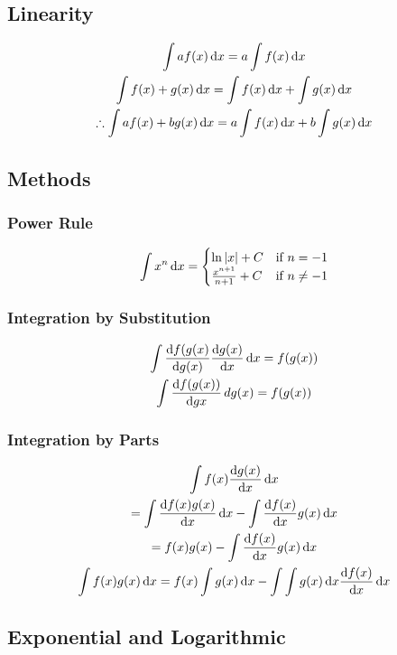 \documentclass[12pt]{article}
\begin{document}
		\subsection{Linearity}
			\begin{gather}
				\integral{af(x)} = a\integral{f(x)} \\
				\integral{f(x) + g(x)} = \integral{f(x)} +
				\integral{g(x)} \\
				\therefore \integral{af(x) + bg(x)} = a\integral{f(x)}
				+ b\integral{g(x)}
			\end{gather}
		\subsection{Methods}
			\subsubsection{Power Rule}
				\begin{gather}
					\integral{x^n} =
						\begin{cases}
							\ln |x| + C & \text{if }
							n = -1 \\
							\frac{x^{n+1}}{n+1} + C
							& \text{if } n \neq -1
						\end{cases}
				\end{gather}
			\subsubsection{Integration by Substitution}
				\begin{gather}
					\integral{\derivative[g(x)]{f(g(x)}\derivative{g(x)}}
					= f(g(x)) \\
					\int
					\derivative[g{x}]{f(g(x))}\,dg(x) =
					f(g(x))
				\end{gather}
			\subsubsection{Integration by Parts}
				\begin{gather}
					\integral{f(x)\derivative{g(x)}} \\
					= \integral{\derivative{f(x)g(x)}} -
					\integral{\derivative{f(x)}g(x)} \\
					= f(x)g(x) - \integral{\derivative{f(x)}g(x)}
					\\
					\integral{f(x)g(x)} = f(x)\integral{g(x)}
					- \integral{\integral{g(x)}\derivative{f(x)}}
				\end{gather}
		\subsection{Exponential and Logarithmic}
\end{document}

